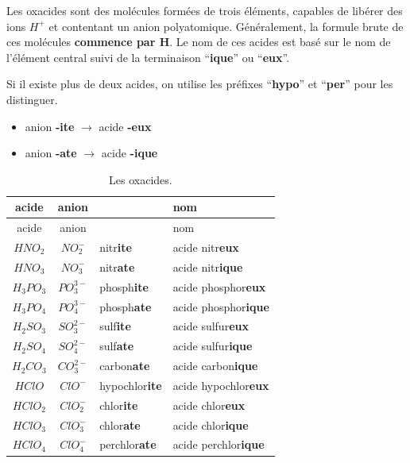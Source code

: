 \documentclass[
  11pt,
  a4paper,
  openany]{book}
\providecommand{\tightlist}{%
  \setlength{\itemsep}{0pt}\setlength{\parskip}{0pt}}
\begin{document}
Les oxacides sont des molécules formées de trois éléments, capables de libérer des ions \(H^+\) et contentant un anion polyatomique. Généralement, la formule brute de ces molécules \textbf{commence par H}. Le nom de ces acides est basé sur le nom de l'élément central suivi de la terminaison ``\textbf{ique}'' ou ``\textbf{eux}''.

Si il existe plus de deux acides, on utilise les préfixes ``\textbf{hypo}'' et ``\textbf{per}'' pour les distinguer.

\begin{itemize}
\tightlist
\item
  anion \textbf{-ite} \(\longrightarrow\) acide \textbf{-eux}
\item
  anion \textbf{-ate} \(\longrightarrow\) acide \textbf{-ique}
\end{itemize}

\newpage

\begin{longtable}[]{@{}ccll@{}}
\caption{\label{tab:oxacides} Les oxacides.}\tabularnewline
\toprule\noalign{}
acide & anion & & nom \\
\midrule\noalign{}
\endfirsthead
\toprule\noalign{}
acide & anion & & nom \\
\midrule\noalign{}
\endhead
\bottomrule\noalign{}
\endlastfoot
\(HNO_2\) & \(NO_2^{-}\) & nitr\textbf{ite} & acide nitr\textbf{eux} \\
\(HNO_3\) & \(NO_3^{-}\) & nitr\textbf{ate} & acide nitr\textbf{ique} \\
\(H_3PO_3\) & \(PO_3^{3-}\) & phosph\textbf{ite} & acide phosphor\textbf{eux} \\
\(H_3PO_4\) & \(PO_4^{3-}\) & phosph\textbf{ate} & acide phosphor\textbf{ique} \\
\(H_2SO_3\) & \(SO_3^{2-}\) & sulf\textbf{ite} & acide sulfur\textbf{eux} \\
\(H_2SO_4\) & \(SO_4^{2-}\) & sulf\textbf{ate} & acide sulfur\textbf{ique} \\
\(H_2CO_3\) & \(CO_3^{2-}\) & carbon\textbf{ate} & acide carbon\textbf{ique} \\
\(HClO\) & \(ClO^{-}\) & hypochlor\textbf{ite} & acide hypochlor\textbf{eux} \\
\(HClO_2\) & \(ClO_2^{-}\) & chlor\textbf{ite} & acide chlor\textbf{eux} \\
\(HClO_3\) & \(ClO_3^{-}\) & chlor\textbf{ate} & acide chlor\textbf{ique} \\
\(HClO_4\) & \(ClO_4^{-}\) & perchlor\textbf{ate} & acide perchlor\textbf{ique} \\
\end{longtable}
\end{document}
